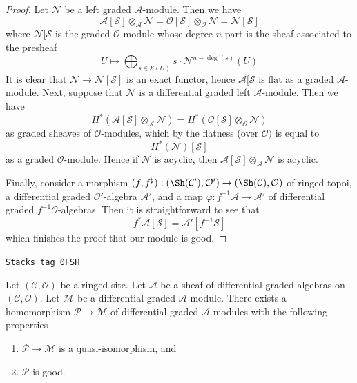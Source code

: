 \begin{proof}
Let $\mathcal{N}$ be a left graded $\mathcal{A}$-module.
Then we have
$$
\mathcal{A}[\mathcal{S}] \otimes_\mathcal{A} \mathcal{N} =
\mathcal{O}[\mathcal{S}] \otimes_\mathcal{O} \mathcal{N} =
\mathcal{N}[\mathcal{S}]
$$
where $\mathcal{N}[\mathcal{S}$ is the
graded $\mathcal{O}$-module whose degree $n$ part
is the sheaf associated to the presheaf
$$
U \longmapsto
\bigoplus\nolimits_{s \in \mathcal{S}(U)} s \cdot \mathcal{N}^{n - \deg(s)}(U)
$$
It is clear that $\mathcal{N} \to \mathcal{N}[\mathcal{S}]$
is an exact functor, hence $\mathcal{A}[\mathcal{S}$ is flat
as a graded $\mathcal{A}$-module. Next, suppose that $\mathcal{N}$
is a differential graded left $\mathcal{A}$-module. Then we have
$$
H^*(\mathcal{A}[\mathcal{S}] \otimes_\mathcal{A} \mathcal{N}) =
H^*(\mathcal{O}[\mathcal{S}] \otimes_\mathcal{O} \mathcal{N})
$$
as graded sheaves of $\mathcal{O}$-modules, which by the flatness
(over $\mathcal{O})$ is equal to
$$
H^*(\mathcal{N})[\mathcal{S}]
$$
as a graded $\mathcal{O}$-module. Hence if $\mathcal{N}$ is acyclic,
then $\mathcal{A}[\mathcal{S}] \otimes_\mathcal{A} \mathcal{N}$
is acyclic.

\medskip\noindent
Finally, consider a morphism
$(f, f^\sharp) : (\Sh(\mathcal{C}'), \mathcal{O}')
\to (\Sh(\mathcal{C}), \mathcal{O})$
of ringed topoi, a differential graded $\mathcal{O}'$-algebra
$\mathcal{A}'$, and a map $\varphi : f^{-1}\mathcal{A} \to \mathcal{A}'$
of differential graded $f^{-1}\mathcal{O}$-algebras.
Then it is straightforward to see that
$$
f^*\mathcal{A}[\mathcal{S}] = \mathcal{A}'[f^{-1}\mathcal{S}]
$$
which finishes the proof that our module is good.
\end{proof}

\begin{lemma}[Resolve]
\label{sdga-lemma-resolve}
\href{https://stacks.math.columbia.edu/tag/0FSH}{\texttt{Stacks tag 0FSH}}

Let $(\mathcal{C}, \mathcal{O})$ be a ringed site.
Let $\mathcal{A}$ be a sheaf of differential graded algebras
on $(\mathcal{C}, \mathcal{O})$. Let $\mathcal{M}$
be a differential graded $\mathcal{A}$-module. There exists a homomorphism
$\mathcal{P} \to \mathcal{M}$ of differential graded $\mathcal{A}$-modules
with the following properties
\begin{enumerate}
\item $\mathcal{P} \to \mathcal{M}$ is a quasi-isomorphism, and
\item $\mathcal{P}$ is good.
\end{enumerate}
\end{lemma}

